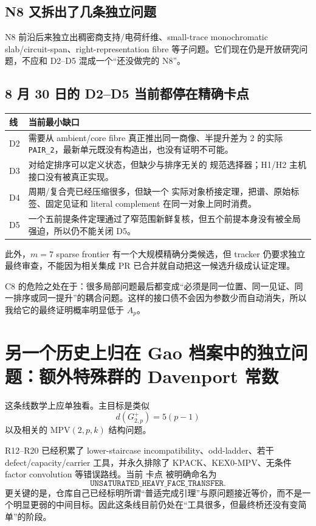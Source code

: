 \documentclass[11pt,a4paper]{ctexart}
\begin{document}
\subsection{N8 又拆出了几条独立问题}

N8 前沿后来独立出稠密商支持/电荷纤维、small-trace monochromatic slab/circuit-span、right-representation fibre 等子问题。它们现在仍是开放研究问题，不应和 D2--D5 混成一个“还没做完的 N8”。

\subsection{8 月 30 日的 D2--D5 当前都停在精确卡点}

\begin{longtable}{p{}p{}}
\toprule
线 & 当前最小缺口\\
\midrule
\endhead
D2 & 需要从 ambient/core fibre 真正推出同一商像、半提升差为 2 的实际 \texttt{PAIR\_2}，最新单元既没有构造出，也没有证明不可能。\\
D3 & 对给定排序可以定义状态，但缺少与排序无关的 规范选择器；H1/H2 主机接口没有被真正实现。\\
D4 & 周期/复合壳已经压缩很多，但缺一个 实际对象桥接定理，把谱、原始标签、固定见证和 literal complement 在同一对象上同时消费。\\
D5 & 一个五前提条件定理通过了窄范围新鲜复核，但五个前提本身没有被全局强迫，所以仍不能关闭 D5。\\
\bottomrule
\end{longtable}

此外，$m=7$ sparse frontier 有一个大规模精确分类候选，但 tracker 仍要求独立最终审查，不能因为相关集成 PR 已合并就自动把这一候选升级成认证定理。

C8 的危险之处在于：很多局部问题最后都变成“必须是同一位置、同一见证、同一排序或同一提升”的耦合问题。这样的接口债不会因为参数少而自动消失，所以我给它的最终证明概率明显低于 $A_p$。

\section{另一个历史上归在 Gao 档案中的独立问题：额外特殊群的 Davenport 常数}

这条线数学上应单独看。主目标是类似
\[
d(G^+_{2,p})=5(p-1)
\]
以及相关的 $\mathrm{MPV}(2,p,k)$ 结构问题。

R12--R20 已经积累了 lower-staircase incompatibility、odd-ladder、若干 defect/capacity/carrier 工具，并永久排除了 KPACK、KEX0-MPV、无条件 factor convolution 等错误路线。当前 卡点 被明确命名为
\[
\texttt{UNSATURATED\_HEAVY\_FACE\_TRANSFER}.
\]
更关键的是，仓库自己已经标明所谓“普适完成引理”与原问题接近等价，而不是一个明显更弱的中间目标。因此这条线目前仍处在“工具很多，但最终桥还没有变简单”的阶段。
\end{document}
